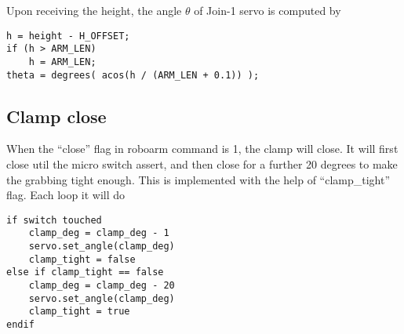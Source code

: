 Upon receiving the height, the angle $\theta$ of Join-1 servo is computed by 
\begin{lstlisting}
h = height - H_OFFSET;
if (h > ARM_LEN)
    h = ARM_LEN;
theta = degrees( acos(h / (ARM_LEN + 0.1)) );
\end{lstlisting}

\subsection{Clamp close}
When the ``close'' flag in roboarm command is 1, the clamp will close. It will first close util the 
micro switch assert, and then close for a further 20 degrees to make the grabbing tight enough.
This is implemented with the help of ``clamp\_tight'' flag. Each loop it will do
\begin{lstlisting}
if switch touched
    clamp_deg = clamp_deg - 1
    servo.set_angle(clamp_deg)
    clamp_tight = false
else if clamp_tight == false
    clamp_deg = clamp_deg - 20
    servo.set_angle(clamp_deg)
    clamp_tight = true
endif
\end{lstlisting}